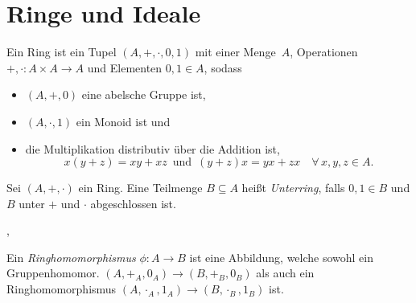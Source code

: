\documentclass{cheat-sheet}
\begin{document}

\section{Ringe und Ideale}



\begin{defn}
  Ein Ring ist ein Tupel $(A, +, \cdot, 0, 1)$ mit einer Menge~$A$, Operationen $+, \cdot : A \times A \to A$ und Elementen $0, 1 \in A$, sodass
  \begin{itemize}
    \item $(A, +, 0)$ eine abelsche Gruppe ist,
    \item $(A, \cdot, 1)$ ein Monoid ist und
    \item die Multiplikation distributiv über die Addition ist, \dh{}
    \[
      x (y + z) = x y + x z
      \enspace \text{und} \enspace
      (y + z) x = y x + z x
      \quad \forall \, x, y, z \in A.
    \]
  \end{itemize}
\end{defn}

\begin{bspe}
  \inlineitem{$\Z$,} \enspace
   \enspace
\end{bspe}


\begin{defn}
  Sei $(A, +, \cdot)$ ein Ring.
  Eine Teilmenge $B \subseteq A$ heißt \emph{Unterring}, falls $0, 1 \in B$ und $B$ unter $+$ und $\cdot$ abgeschlossen ist.
\end{defn}

\begin{bspe}
  \inlineitem{$\Z \subset \Q$}, \enspace
\end{bspe}


\begin{defn}
  Ein \emph{Ringhomomorphismus} $\phi : A \to B$ ist eine Abbildung, welche sowohl ein Gruppenhomomor. $(A, +_A, 0_A) \to (B, +_B, 0_B)$ als auch ein Ringhomomorphismus $(A, \cdot_A, 1_A) \to (B, \cdot_B, 1_B)$ ist.
\end{defn}
\end{document}
